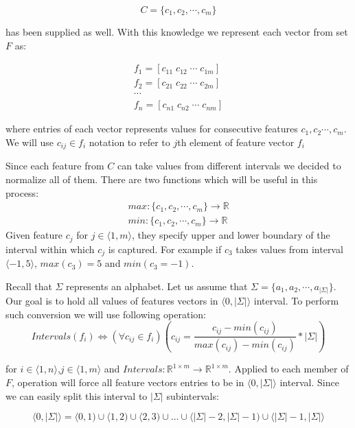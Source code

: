 \documentclass{mini}
\begin{document}
\[ C = \{ c_1 , c_2, \cdots , c_m \}\] 

has been supplied as well. With this knowledge we represent each vector from set $F$ as: 

\begin{align*}
f_1 = [ c_{11} \; c_{12} \; \cdots \; c_{1m}] \\
f_2 = [ c_{21} \; c_{22} \; \cdots \; c_{2m}] \\
\cdots \\
f_n = [ c_{n1} \; c_{n2} \; \cdots \; c_{nm}] 
\end{align*}

where entries of each vector represents values for consecutive features $c_1, c_2 \cdots , c_m$. We will use $c_{ij }\in f_i$ notation to refer to $j$th element of feature vector $f_i$

Since each feature from $C$ can take values from different intervals we decided to normalize all of them. There are two functions which will be useful in this process:
\begin{align*}
max : \{c_1, c_2, \cdots, c_m\} \rightarrow \mathbb{R} \\
min : \{c_1, c_2, \cdots, c_m\} \rightarrow \mathbb{R}
\end{align*}
Given feature $c_j$ for $j \in \langle 1, m \rangle$, they specify upper and lower boundary of the interval within which $c_j$ is captured. For example if $c_3$ takes values from interval $\langle -1 , 5 \rangle$, $max(c_3) = 5$ and $min(c_3 = -1)$.

Recall that $\Sigma$ represents an alphabet. Let us assume that $\Sigma = \{a_1 , a_2, \cdots, a_{|\Sigma|}\}$. Our goal is to hold all values of features vectors in $\langle 0 , |\Sigma| \rangle$ interval. To perform such conversion we will use following operation:
\begin{equation}
Intervals(f_i) \Leftrightarrow (\forall{c_{ij} \in f_i})(c_{ij} =  \frac{c_{ij} - min(c_{ij})}{max(c_{ij}) - min(c_{ij})} * |\Sigma|)
\end{equation}

for $i \in \langle 1, n \rangle$,$j \in \langle 1, m \rangle$ and $Intervals : \mathbb{R}^{1 \times m} \rightarrow \mathbb{R}^{1 \times m}$. Applied to each member of $F$, operation will force all feature vectors entries to be in $\langle 0 , |\Sigma| \rangle$ interval. Since we can easily split this interval to $|\Sigma|$ subintervals:

\[
\langle 0 , |\Sigma| \rangle = \langle 0 , 1) \cup \langle 1 , 2 ) \cup \langle 2 , 3 ) \cup \ldots \cup \langle |\Sigma| -2 , |\Sigma| -1 ) \cup \langle |\Sigma| -1, |\Sigma|  \rangle
\] 
\end{document}
